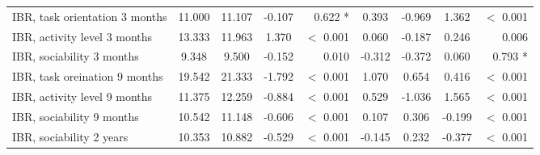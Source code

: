 \begin{tabular}{l c c c r c c c r}
IBR, task orientation 3 months & 11.000 & 11.107 & -0.107 & 0.622 * & 0.393 & -0.969 & 1.362 & $ < $ 0.001 \\
IBR, activity level 3 months & 13.333 & 11.963 & 1.370 & $ < $ 0.001 & 0.060 & -0.187 & 0.246 & 0.006 \\
IBR, sociability 3 months & 9.348 & 9.500 & -0.152 & 0.010 & -0.312 & -0.372 & 0.060 & 0.793 * \\
IBR, task oreination 9 months & 19.542 & 21.333 & -1.792 & $ < $ 0.001 & 1.070 & 0.654 & 0.416 & $ < $ 0.001 \\
IBR, activity level 9 months & 11.375 & 12.259 & -0.884 & $ < $ 0.001 & 0.529 & -1.036 & 1.565 & $ < $ 0.001 \\
IBR, sociability 9 months & 10.542 & 11.148 & -0.606 & $ < $ 0.001 & 0.107 & 0.306 & -0.199 & $ < $ 0.001 \\
IBR, sociability 2 years & 10.353 & 10.882 & -0.529 & $ < $ 0.001 & -0.145 & 0.232 & -0.377 & $ < $ 0.001 \\
\bottomrule
\end{tabular}
